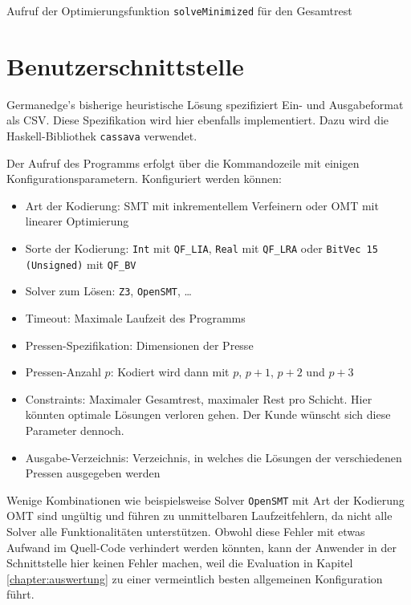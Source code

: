 \begin{listing}[H]
    \inputminted[linenos=true]{haskell}{Code/Implementierung/OptimizationTotalWaste.hs}
    \caption{Aufruf der Optimierungsfunktion \texttt{solveMinimized} für den Gesamtrest}
    \label{listing:solveminimized}
\end{listing}

\section{Benutzerschnittstelle}
Germanedge's bisherige heuristische Lösung spezifiziert Ein- und Ausgabeformat als CSV.
Diese Spezifikation wird hier ebenfalls implementiert.
Dazu wird die Haskell-Bibliothek \texttt{cassava} \cite{cassava} verwendet.

Der Aufruf des Programms erfolgt über die Kommandozeile mit einigen Konfigurationsparametern.
Konfiguriert werden können:

\begin{itemize}
    \item Art der Kodierung: SMT mit inkrementellem Verfeinern oder OMT mit linearer Optimierung
    \item Sorte der Kodierung: \texttt{Int} mit \texttt{QF\_LIA}, \texttt{Real} mit \texttt{QF\_LRA} oder \texttt{BitVec 15 (Unsigned)} mit \texttt{QF\_BV}
    \item Solver zum Lösen: \texttt{Z3}, \texttt{OpenSMT}, \ldots
    \item Timeout: Maximale Laufzeit des Programms
    \item Pressen-Spezifikation: Dimensionen der Presse
    \item Pressen-Anzahl $p$: Kodiert wird dann mit $p$, $p+1$, $p+2$ und $p+3$
    \item Constraints: Maximaler Gesamtrest, maximaler Rest pro Schicht. Hier könnten optimale Lösungen verloren gehen. Der Kunde wünscht sich diese Parameter dennoch.
    \item Ausgabe-Verzeichnis: Verzeichnis, in welches die Lösungen der verschiedenen Pressen ausgegeben werden
\end{itemize}

Wenige Kombinationen wie beispielsweise Solver \texttt{OpenSMT} mit Art der Kodierung OMT sind ungültig und führen zu unmittelbaren Laufzeitfehlern,
da nicht alle Solver alle Funktionalitäten unterstützen.
Obwohl diese Fehler mit etwas Aufwand im Quell-Code verhindert werden könnten, kann der Anwender in der Schnittstelle hier keinen Fehler machen, weil
die Evaluation in Kapitel \ref{chapter:auswertung} zu einer vermeintlich besten allgemeinen Konfiguration führt.